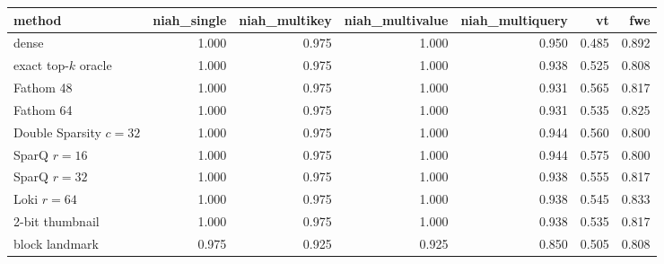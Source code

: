 \begin{tabular}{lrrrrrr}
\toprule
method & niah\_single & niah\_multikey & niah\_multivalue & niah\_multiquery & vt & fwe \\
\midrule
dense & 1.000 & 0.975 & 1.000 & 0.950 & 0.485 & 0.892 \\
exact top-$k$ oracle & 1.000 & 0.975 & 1.000 & 0.938 & 0.525 & 0.808 \\
Fathom 48 & 1.000 & 0.975 & 1.000 & 0.931 & 0.565 & 0.817 \\
Fathom 64 & 1.000 & 0.975 & 1.000 & 0.931 & 0.535 & 0.825 \\
Double Sparsity $c{=}32$ & 1.000 & 0.975 & 1.000 & 0.944 & 0.560 & 0.800 \\
SparQ $r{=}16$ & 1.000 & 0.975 & 1.000 & 0.944 & 0.575 & 0.800 \\
SparQ $r{=}32$ & 1.000 & 0.975 & 1.000 & 0.938 & 0.555 & 0.817 \\
Loki $r{=}64$ & 1.000 & 0.975 & 1.000 & 0.938 & 0.545 & 0.833 \\
2-bit thumbnail & 1.000 & 0.975 & 1.000 & 0.938 & 0.535 & 0.817 \\
block landmark & 0.975 & 0.925 & 0.925 & 0.850 & 0.505 & 0.808 \\
\bottomrule
\end{tabular}